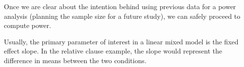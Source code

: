 \documentclass{ar-1col}\usepackage[]{graphicx}\usepackage[]{color}
\begin{document}
Once we are clear about the intention behind using previous data for a power analysis (planning the sample size for a future study), we can safely proceed to compute power. 



Usually, the primary parameter of interest in a linear mixed model is the fixed effect slope. In the relative clause example, the slope would represent  \citep[under an appropriate sum-contrast coding,][]{SchadEtAlcontrasts} the difference in means between the two conditions. 



\end{document}
